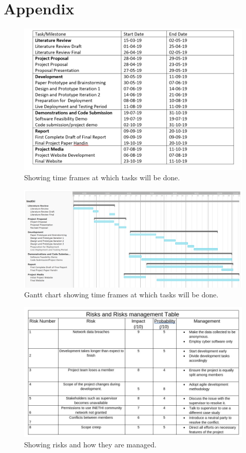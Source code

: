 \section*{Appendix}
\begin{figure}
	\begin{center}
		\includegraphics[width=1\linewidth]{res/milestone.PNG}
	\end{center}
	\caption{Showing time frames at which tasks will be done.}
	\label{fig-ffsm}
\end{figure}
\begin{figure}
	\begin{center}
		\includegraphics[width=1\linewidth]{res/gantt.PNG}
	\end{center}
	\caption{Gantt chart showing time frames at which tasks will be done.}
	\label{fig-ffsm}
\end{figure}
\begin{figure}
	\begin{center}
		\includegraphics[width=1\linewidth]{res/risks.jpeg}
	\end{center}
	\caption{Showing risks and how they are managed.}
	\label{fig-ffsm}
\end{figure}